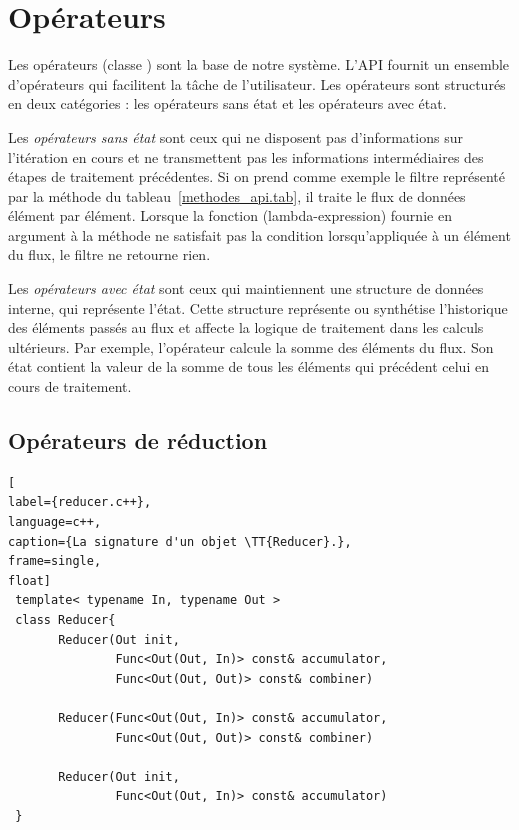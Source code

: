 \section{Op\'erateurs}

Les op\'erateurs (classe ) sont la base de notre syst\`eme. L'API fournit un ensemble d'op\'erateurs qui facilitent la t\^ache de l'utilisateur. Les op\'erateurs sont structur\'es en deux cat\'egories : les op\'erateurs sans \'etat et les op\'erateurs avec \'etat.

Les \emph{op\'erateurs sans \'etat} sont ceux qui ne disposent pas d'informations sur l'it\'eration en cours et ne transmettent pas les informations interm\'ediaires des \'etapes de traitement pr\'ec\'edentes. Si on prend comme exemple le filtre repr\'esent\'e par la m\'ethode  du tableau~\ref{methodes_api.tab}, il traite le flux de donn\'ees \'el\'ement par \'el\'ement. 
%
Lorsque la fonction (lambda-expression) fournie en argument \`a la m\'ethode  ne satisfait pas la condition lorsqu'appliqu\'ee \`a un \'el\'ement du flux, le filtre ne retourne rien. 

Les \emph{op\'erateurs avec \'etat} sont ceux qui maintiennent une structure de donn\'ees interne, qui repr\'esente l'\'etat. Cette structure repr\'esente ou synth\'etise l'historique des \'el\'ements pass\'es au flux et affecte la logique de traitement dans les calculs ult\'erieurs. Par exemple, l'op\'erateur  calcule la somme des \'el\'ements du flux. Son \'etat contient la valeur de la somme de tous les \'el\'ements qui pr\'ec\'edent celui en cours de traitement. 

\subsection*{Op\'erateurs de r\'eduction}

\label{reducer.sect}

\begin{lstlisting}[
label={reducer.c++},
language=c++,
caption={La signature d'un objet \TT{Reducer}.},
frame=single,
float]
 template< typename In, typename Out >
 class Reducer{
       Reducer(Out init, 
               Func<Out(Out, In)> const& accumulator,
               Func<Out(Out, Out)> const& combiner)

       Reducer(Func<Out(Out, In)> const& accumulator,
               Func<Out(Out, Out)> const& combiner)

       Reducer(Out init, 
               Func<Out(Out, In)> const& accumulator)
 }
\end{lstlisting}



